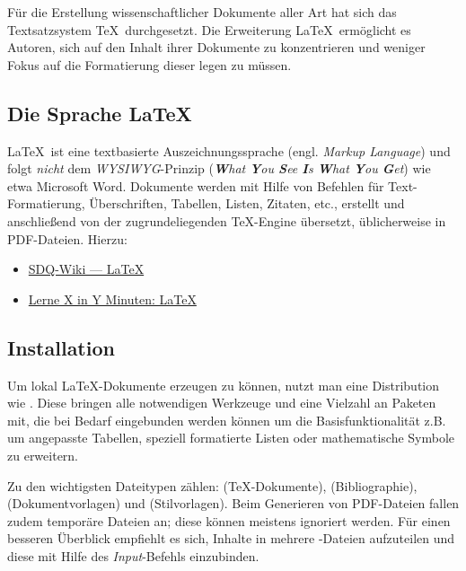 Für die Erstellung wissenschaftlicher Dokumente aller Art hat sich das Textsatzsystem \TeX\ durchgesetzt.
Die Erweiterung \LaTeX\ ermöglicht es Autoren, sich auf den Inhalt ihrer Dokumente zu konzentrieren und weniger Fokus auf die Formatierung dieser legen zu müssen.

\subsection{Die Sprache \LaTeX}%
\label{sec:Schreiben:Sprache}

\LaTeX\ ist eine textbasierte Auszeichnungssprache (engl. \emph{Markup Language}) und folgt \emph{nicht} dem \emph{WYSIWYG}-Prinzip (\emph{\textbf{W}hat \textbf{Y}ou \textbf{S}ee \textbf{I}s \textbf{W}hat \textbf{Y}ou \textbf{G}et}) wie etwa Microsoft Word.
Dokumente werden mit Hilfe von Befehlen für Text-Formatierung, Überschriften, Tabellen, Listen, Zitaten, etc., erstellt und anschließend von der zugrundeliegenden \TeX-Engine übersetzt, üblicherweise in PDF-Dateien.
Hierzu:

\smallskip
\begin{itemize}[label={\symbolInfo}]
    \item \href{https://sdqweb.ipd.kit.edu/wiki/LaTeX}{SDQ-Wiki --- LaTeX}
    \item \href{https://learnxinyminutes.com/docs/de-de/latex-de/}{Lerne X in Y Minuten: LaTeX}
\end{itemize}

\subsection{Installation}%
\label{sec:Schreiben:Installation}

Um lokal \LaTeX-Dokumente erzeugen zu können, nutzt man eine Distribution wie .
Diese bringen alle notwendigen Werkzeuge und eine Vielzahl an Paketen mit, die bei Bedarf eingebunden werden können um die Basisfunktionalität z.B. um angepasste Tabellen, speziell formatierte Listen oder mathematische Symbole zu erweitern.

Zu den wichtigsten Dateitypen zählen:  (\TeX-Dokumente),  (Bibliographie),  (Dokumentvorlagen) und  (Stilvorlagen).
Beim Generieren von PDF-Dateien fallen zudem temporäre Dateien an; diese können meistens ignoriert werden.
Für einen besseren Überblick empfiehlt es sich, Inhalte in mehrere -Dateien aufzuteilen und diese mit Hilfe des \emph{Input}-Befehls einzubinden.

